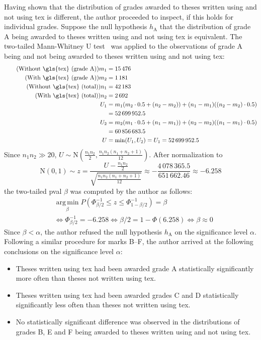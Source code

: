 \documentclass[digital,table,color]{fithesis3/fithesis3}
\begin{document}
  Having shown that the distribution of grades awarded to theses
  written using and not using \gls{tex} is different, the author
  proceeded to inspect, if this holds for individual grades.
  Suppose the null \gls{hypothesis} $h_\text{A}$ that the
  distribution of grade A being awarded to theses written using and
  not using \gls{tex} is equivalent. The two-tailed Mann-Whitney U
  test~\cite{mann47,manntut} was applied to the observations of
  grade A being and not being awarded to theses written using and
  not using \gls{tex}: \begin{align}
    \tag{Without \gls{tex} (grade A)} m_1 &= 15\,476 \\
    \tag{With \gls{tex} (grade A)}    m_2 &= 1\,181  \\
    \tag{Without \gls{tex} (total)} n_1 &= 42\,183 \\
    \tag{With \gls{tex} (total)}    n_2 &= 2\,692  \\
    U_1 &=  m_1(m_2\cdot0.5+(n_2-m_2))+
                  (n_1-m_1)((n_2-m_2)\cdot0.5) \\
      \nonumber&=52\,699\,952.5 \\
    U_2 &=  m_2(m_1\cdot0.5+(n_1-m_1))+
                  (n_2-m_2)((n_1-m_1)\cdot0.5) \\
      \nonumber&=60\,856\,683.5 \\
    U &= \min(U_1,U_2) = U_1 = 52\,699\,952.5
  \end{align} Since $n_1n_2\gg20$,
  $U\sim\text{N}\left(\frac{n_1n_2}2,
  \frac{n_1n_2(n_1+n_2+1)}{12}\right)$. After normalization to
  \begin{equation}
    \text{N}(0,1)\sim z =
    \frac{U-\frac{n_1n_2}2}{\sqrt{\frac{n_1n_2(n_1+n_2+1)}{12}}}
    \approx-\frac{4\,078\,365.5}{651\,662.46}\approx-6.258
  \end{equation} the two-tailed \gls{pval} $\beta$ was computed by
  the author as follows:\begin{align}
    & \operatorname{arg\,min}\limits_{\beta} P(\Phi^{-1}_{\beta/2}
        \leq z\leq\Phi^{-1}_{1-\beta/2})=\beta \\
    \nonumber& \iff\Phi^{-1}_{\beta/2}=-6.258 \iff\beta/2=1-
        \Phi(6.258)\iff\beta\approx 0
  \end{align}Since $\beta<\alpha$, the author refused the null
  \gls{hypothesis} $h_\text{A}$ on the significance level $\alpha$.
  Following a similar procedure for marks B--F, the author arrived
  at the following conclusions on the significance level $\alpha$:
  \begin{itemize}
    \item Theses written using \gls{tex} had been awarded grade A
      statistically significantly more often than theses not
      written using \gls{tex}.
    \item Theses written using \gls{tex} had been awarded grades C
      and D statistically significantly less often than theses not
      written using \gls{tex}.
    \item No statistically significant difference was observed in
      the distributions of grades B, E and F being awarded to
      theses written using and not using \gls{tex}.
  \end{itemize}
\end{document}
